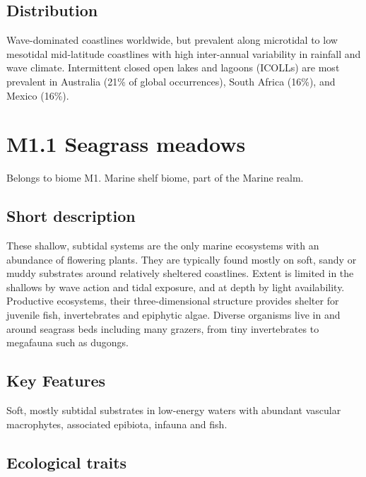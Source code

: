 \documentclass[
  letterpaper,
  DIV=11,
  numbers=noendperiod]{scrartcl}
\begin{document}
\subsection{Distribution}\label{distribution-24}

Wave-dominated coastlines worldwide, but prevalent along microtidal to
low mesotidal mid-latitude coastlines with high inter-annual variability
in rainfall and wave climate. Intermittent closed open lakes and lagoons
(ICOLLs) are most prevalent in Australia (21\% of global occurrences),
South Africa (16\%), and Mexico (16\%).

\section{M1.1 Seagrass meadows}\label{m1.1-seagrass-meadows}

Belongs to biome M1. Marine shelf biome, part of the Marine realm.

\subsection{Short description}\label{short-description-25}

These shallow, subtidal systems are the only marine ecosystems with an
abundance of flowering plants. They are typically found mostly on soft,
sandy or muddy substrates around relatively sheltered coastlines. Extent
is limited in the shallows by wave action and tidal exposure, and at
depth by light availability. Productive ecosystems, their
three-dimensional structure provides shelter for juvenile fish,
invertebrates and epiphytic algae. Diverse organisms live in and around
seagrass beds including many grazers, from tiny invertebrates to
megafauna such as dugongs.

\subsection{Key Features}\label{key-features-25}

Soft, mostly subtidal substrates in low-energy waters with abundant
vascular macrophytes, associated epibiota, infauna and fish.

\subsection{Ecological traits}\label{ecological-traits-25}
\end{document}
